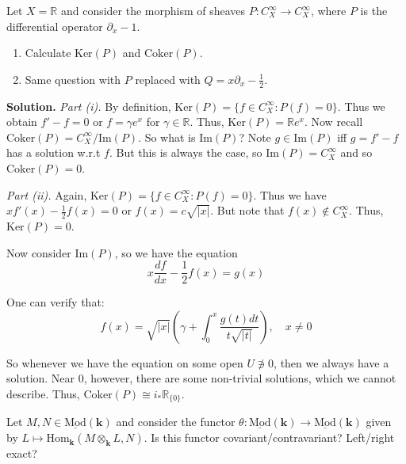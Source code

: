 \documentclass{category-template}
\begin{document}
\begin{problem}
    Let $X=\mathbb{R}$ and consider the morphism of sheaves $P: C_X^{\infty} \to
    C_X^{\infty}$, where $P$ is the differential operator $\partial_x-1$.
    \begin{enumerate}
        \item[(i)] Calculate $\text{Ker}(P)$ and $\text{Coker}(P)$.
        \item[(ii)] Same question with $P$ replaced with $Q=x\partial_x - \frac{1}{2}$. 
    \end{enumerate}
\end{problem}

\textbf{Solution.} \textit{Part (i).} By definition, $\text{Ker}(P) = \{f \in
C_X^{\infty}: P(f) = 0\}$. Thus we obtain $f'-f=0$ or $f=\gamma e^x$ for $\gamma
\in \mathbb{R}$. Thus, $\text{Ker}(P) = \mathbb{R}e^x$. Now recall
$\text{Coker}(P) = C_X^{\infty} / \text{Im}(P)$. So what is $\text{Im}(P)$? Note
$g \in \text{Im}(P)$ iff $g = f'-f$ has a solution w.r.t $f$. But this is always
the case, so $\text{Im}(P) = C_X^{\infty}$ and so $\text{Coker}(P) = 0$.

\textit{Part (ii).} Again, $\text{Ker}(P) = \{f \in C_X^{\infty}: P(f) = 0\}$.
Thus we have $xf'(x) - \frac{1}{2}f(x) = 0$ or $f(x)=c\sqrt{|x|}$. But note that
$f(x) \not\in C_X^{\infty}$. Thus, $\text{Ker}(P) = 0$.

Now consider $\text{Im}(P)$, so we have the equation
\begin{equation*}
    x\frac{df}{dx} - \frac{1}{2}f(x) = g(x)
\end{equation*}

One can verify that:
\begin{equation*}
    f(x) = \sqrt{|x|}\left(\gamma + \int_0^x \frac{g(t)dt}{t\sqrt{|t|}}\right), \quad x \neq 0
\end{equation*}

So whenever we have the equation on some open $U \not\ni 0$, then we always have
a solution. Near $0$, however, there are some non-trivial solutions, which we
cannot describe. Thus, $\text{Coker}(P) \cong i_*\mathbb{R}_{\{0\}}$.

\begin{problem}
    Let $M,N \in \underline{\text{Mod}}(\mathbf{k})$ and consider the functor
    $\theta: \underline{\text{Mod}}(\mathbf{k}) \to
    \underline{\text{Mod}}(\mathbf{k})$ given by $L \mapsto
    \text{Hom}_{\mathbf{k}}(M \otimes_{\mathbf{k}} L, N)$. Is this functor 
    covariant/contravariant? Left/right exact?
\end{problem}
\end{document}
